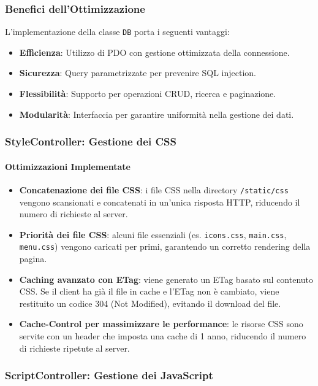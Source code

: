 \subsubsection{Benefici dell'Ottimizzazione}
L'implementazione della classe \texttt{DB} porta i seguenti vantaggi:
\begin{itemize}
    \item \textbf{Efficienza}: Utilizzo di PDO con gestione ottimizzata della connessione.
    \item \textbf{Sicurezza}: Query parametrizzate per prevenire SQL injection.
    \item \textbf{Flessibilit\`a}: Supporto per operazioni CRUD, ricerca e paginazione.
    \item \textbf{Modularit\`a}: Interfaccia per garantire uniformit\`a nella gestione dei dati.
\end{itemize}

\subsubsection{StyleController: Gestione dei CSS}
\paragraph{Ottimizzazioni Implementate}
\begin{itemize}
    \item \textbf{Concatenazione dei file CSS}: i file CSS nella directory \texttt{/static/css} vengono scansionati e concatenati in un'unica risposta HTTP, riducendo il numero di richieste al server.
    \item \textbf{Priorit\`a dei file CSS}: alcuni file essenziali (es. \texttt{icons.css}, \texttt{main.css}, \texttt{menu.css}) vengono caricati per primi, garantendo un corretto rendering della pagina.
    \item \textbf{Caching avanzato con ETag}: viene generato un ETag basato sul contenuto CSS. Se il client ha gi\`a il file in cache e l'ETag non \`e cambiato, viene restituito un codice 304 (Not Modified), evitando il download del file.
    \item \textbf{Cache-Control per massimizzare le performance}: le risorse CSS sono servite con un header che imposta una cache di 1 anno, riducendo il numero di richieste ripetute al server.
\end{itemize}

\subsubsection{ScriptController: Gestione dei JavaScript}

